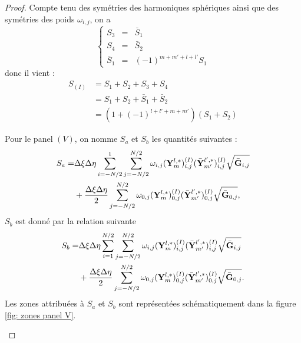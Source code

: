 \begin{proof}
Compte tenu des symétries des harmoniques sphériques ainsi que des symétries des poids $\omega_{i,j}$, on a
\begin{equation}
\left\lbrace
\begin{array}{rcl}
S_3 & = & \bar{S}_1 \\
S_4 & = & \bar{S}_2 \\
\bar{S}_1 & = & (-1)^{m+m'+l+l'} S_1
\end{array}
\right.
\end{equation}
donc il vient :
\begin{align*}
S_{(I)} & = S_1 + S_2 + S_3 + S_4 \\
	& = S_1 + S_2 + \bar{S}_1 + \bar{S}_2 \\
	& = (1+(-1)^{l+l'+m+m'})(S_1+S_2)
\end{align*}

Pour le panel $(V)$, on nomme $S_a$ et $S_b$ les quantités suivantes :
\begin{align*}
S_a = & \Delta \xi \Delta \eta \displaystyle\sum\limits_{i=-N/2}^{1} \displaystyle\sum\limits_{j=-N/2}^{N/2} \omega_{i,j} (\mathbf{Y}_m^{l,*})_{i,j}^{(I)} (\bar{\mathbf{Y}}_{m'}^{l',*})_{i,j}^{(I)} \sqrt{\bar{\mathbf{G}}_{i,j}} \\
		& + \dfrac{\Delta \xi \Delta \eta}{2} \displaystyle\sum\limits_{j=-N/2}^{N/2} \omega_{0,j} (\mathbf{Y}_m^{l,*})_{0,j}^{(I)} (\bar{\mathbf{Y}}_{m'}^{l',*})_{0,j}^{(I)} \sqrt{\bar{\mathbf{G}}_{0,j}},
\end{align*}
$S_b$ est donné par la relation suivante 
\begin{align*}
S_b = & \Delta \xi \Delta \eta \displaystyle\sum\limits_{i=1}^{N/2} \displaystyle\sum\limits_{j=-N/2}^{N/2} \omega_{i,j} (\mathbf{Y}_m^{l,*})_{i,j}^{(I)} (\bar{\mathbf{Y}}_{m'}^{l',*})_{i,j}^{(I)} \sqrt{\bar{\mathbf{G}}_{i,j}} \\
		& + \dfrac{\Delta \xi \Delta \eta}{2} \displaystyle\sum\limits_{j=-N/2}^{N/2} \omega_{0,j} (\mathbf{Y}_m^{l,*})_{0,j}^{(I)} (\bar{\mathbf{Y}}_{m'}^{l',*})_{0,j}^{(I)} \sqrt{\bar{\mathbf{G}}_{0,j}}.
\end{align*}
Les zones attribuées à $S_a$ et $S_b$ sont représentées schématiquement dans la figure \ref{fig: zones panel V}.

\begin{figure}
\begin{center}
\end{center}
\end{figure}
\end{proof}

